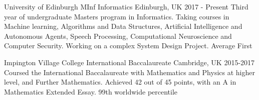 

\begin{cventries}

    \cventryed
        {University of Edinburgh} %
        {MInf Informatics} %
        {Edinburgh, UK} %
        {2017 - Present} %
        {Third year of undergraduate Masters program in Informatics. \newline
        Taking courses in Machine learning, Algorithms and Data Structures, Artificial Intelligence and Autonomous Agents, Speech Processing, Computational Neuroscience and Computer Security. Working on a complex System Design Project.}
        {Average First}
    
    \cventryed
        {Impington Village College}
        {International Baccalaureate}
        {Cambridge, UK}
        {2015-2017}
        {Coursed the International Baccalaureate with Mathematics and Physics at higher level, and Further Mathematics. \newline
        Achieved 42 out of 45 points, with an A in Mathematics Extended Essay.}
        {99th worldwide percentile}
\vspace{-0.1cm}
\end{cventries}
